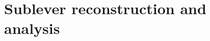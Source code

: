 \documentclass[a4paper]{article}
\begin{document}




\section{Sublever reconstruction and analysis}











\end{document}
